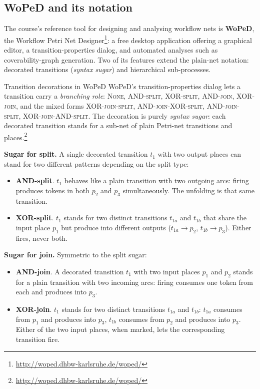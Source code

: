 \subsection{WoPeD and its notation}

The course's reference tool for designing and analysing workflow nets is \textbf{WoPeD}, the Workflow Petri Net Designer\footnote{\url{http://woped.dhbw-karlsruhe.de/woped/}}: a free desktop application offering a graphical editor, a transition-properties dialog, and automated analyses such as coverability-graph generation. Two of its features extend the plain-net notation: decorated transitions (\emph{syntax sugar}) and hierarchical sub-processes.

\begin{notebox}{Transition decorations in WoPeD}
WoPeD's transition-properties dialog lets a transition carry a \emph{branching role}: \textsc{None}, \textsc{AND-split}, \textsc{XOR-split}, \textsc{AND-join}, \textsc{XOR-join}, and the mixed forms \textsc{XOR-join-split}, \textsc{AND-join-XOR-split}, \textsc{AND-join-split}, \textsc{XOR-join-AND-split}. The decoration is purely \emph{syntax sugar}: each decorated transition stands for a sub-net of plain Petri-net transitions and places.\footnote{\url{http://woped.dhbw-karlsruhe.de/woped/}}
\end{notebox}

\textbf{Sugar for split.} A single decorated transition $t_1$ with two output places can stand for two different patterns depending on the split type:

\begin{itemize}
  \item \textbf{AND-split}. $t_1$ behaves like a plain transition with two outgoing arcs: firing produces tokens in both $p_2$ and $p_3$ simultaneously. The unfolding is that same transition.
  \item \textbf{XOR-split}. $t_1$ stands for two distinct transitions $t_{1a}$ and $t_{1b}$ that share the input place $p_1$ but produce into different outputs ($t_{1a} \to p_2$, $t_{1b} \to p_3$). Either fires, never both.
\end{itemize}

\textbf{Sugar for join.} Symmetric to the split sugar:

\begin{itemize}
  \item \textbf{AND-join}. A decorated transition $t_1$ with two input places $p_1$ and $p_2$ stands for a plain transition with two incoming arcs: firing consumes one token from each and produces into $p_3$.
  \item \textbf{XOR-join}. $t_1$ stands for two distinct transitions $t_{1a}$ and $t_{1b}$: $t_{1a}$ consumes from $p_1$ and produces into $p_3$, $t_{1b}$ consumes from $p_2$ and produces into $p_3$. Either of the two input places, when marked, lets the corresponding transition fire.
\end{itemize}

